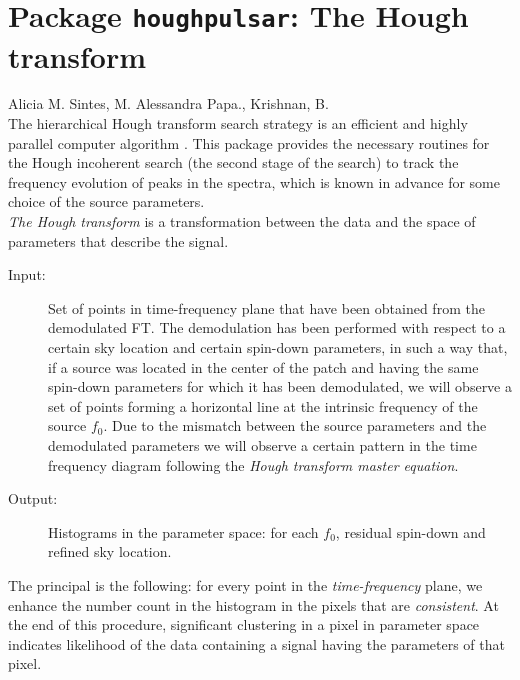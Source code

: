 %
%
%
%

\chapter{Package \texttt{houghpulsar}: The Hough transform}


Alicia M. Sintes, M. Alessandra Papa., Krishnan, B.\\

The  hierarchical Hough transform search strategy is
an efficient and highly parallel computer algorithm
\cite{Schutz:1998} \cite{Papa:2001}.
This package provides the necessary routines for the Hough incoherent search
(the second stage of the search)
  to track the frequency evolution of peaks in the spectra, which
  is known in advance for some choice of the source parameters.\\


{\it The Hough transform} is  a transformation
between the data and the space of parameters that describe the signal.
\begin{description}
\item[ Input:] Set of points in time-frequency plane that have been obtained
from the demodulated FT.
The demodulation  has been performed with respect to a certain sky
location and certain spin-down parameters,
in such a way  that, if a source was located in
the center of the patch and having the same spin-down parameters
for which it has been
demodulated, we will observe a set of points forming a horizontal
line at the intrinsic frequency  of the source $f_0$.
 Due to the mismatch between the source  parameters
 and the demodulated parameters we will observe a certain pattern in the time
  frequency diagram following the
   {\sl Hough transform master equation}.
\item[ Output:] Histograms in the parameter space:
  for each $f_0$, residual spin-down and refined sky location.
\end{description}
The principal is the following: for every point in the {\it  time-frequency}
 plane, we enhance the number count in the
histogram in the pixels that are {\it consistent}. At the end of this procedure,
significant clustering
 in a pixel in parameter space indicates
 likelihood of the data containing a signal
having the parameters
of that pixel.
\\

